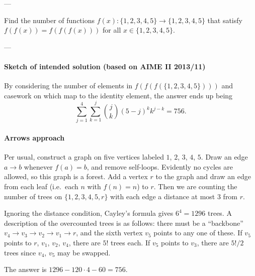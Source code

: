 
---

Find the number of functions $f(x):\{1,2,3,4,5\}\to\{1,2,3,4,5\}$ that satisfy $f(f(x))=f(f(f(x)))$ for all $x\in\{1,2,3,4,5\}$.

---

\paragraph{Sketch of intended solution (based on AIME II 2013/11)} By considering the number of elements in $f(f(f(\{1,2,3,4,5\})))$ and casework on which map to the identity element, the answer ends up being \[\sum_{j=1}^4\sum_{k=1}^j \binom{j}{k}(5-j)^k k^{j-k}=756.\]

\paragraph{Arrows approach} Per usual, construct a graph on five vertices labeled $1$, $2$, $3$, $4$, $5$. Draw an edge $a\to b$ whenever $f(a)=b$, and remove self-loops. Evidently no cycles are allowed, so this graph is a forest. Add a vertex $r$ to the graph and draw an edge from each leaf (i.e.\ each $n$ with $f(n)=n$) to $r$. Then we are counting the number of trees on $\{1,2,3,4,5,r\}$ with each edge a distance at most $3$ from $r$.

Ignoring the distance condition, Cayley's formula gives $6^4=1296$ trees. A description of the overcounted trees is as follows: there must be a ``backbone'' $v_4\to v_3\to v_2\to v_1\to r$, and the sixth vertex $v_5$ points to any one of these. If $v_5$ points to $r$, $v_1$, $v_2$, $v_4$, there are $5!$ trees each. If $v_5$ points to $v_3$, there are $5!/2$ trees since $v_4$, $v_5$ may be swapped.

The answer is $1296-120\cdot4-60=756$.
